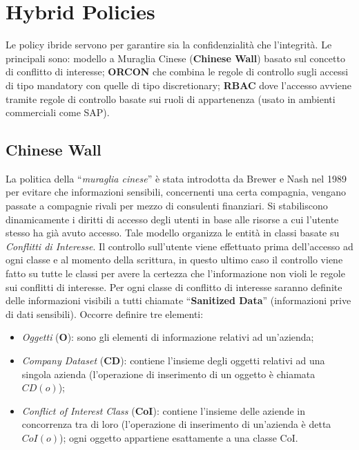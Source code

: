 \section{Hybrid Policies}

Le policy ibride servono per garantire sia la confidenzialità che l'integrità.
Le principali sono: modello a Muraglia Cinese (\textbf{Chinese Wall}) basato sul
concetto di conflitto di interesse; \textbf{ORCON} che combina le regole di
controllo sugli accessi di tipo mandatory con quelle di tipo discretionary;
\textbf{RBAC} dove l'accesso avviene tramite regole di controllo basate sui
ruoli di appartenenza (usato in ambienti commerciali come SAP).

\subsection{Chinese Wall}

La politica della ``\textit{muraglia cinese}'' è stata introdotta da Brewer e Nash
nel 1989 per evitare che informazioni sensibili, concernenti una certa compagnia,
vengano passate a compagnie rivali per mezzo di consulenti finanziari.
Si stabiliscono dinamicamente i diritti di accesso degli utenti in base
alle risorse a cui l'utente stesso ha già avuto accesso.
Tale modello organizza le entità in classi basate su \textit{Conflitti di Interesse}.
Il controllo sull'utente
viene effettuato prima dell'accesso ad ogni classe e al momento della scrittura,
in questo ultimo
caso il controllo viene fatto su tutte le classi per avere la certezza che
l'informazione non violi le
regole sui conflitti di interesse. Per ogni classe di conflitto di interesse
saranno definite delle
informazioni visibili a tutti chiamate ``\textbf{Sanitized Data}''
(informazioni prive di dati sensibili).
Occorre definire tre elementi:

\begin{itemize}
    \item \textit{Oggetti} (\textbf{O}): sono gli elementi di informazione
          relativi ad un'azienda;
    \item \textit{Company Dataset} (\textbf{CD}): contiene l'insieme degli
          oggetti relativi ad una singola azienda
          (l'operazione di inserimento di un oggetto è chiamata \(CD(o)\));
    \item \textit{Conflict of Interest Class} (\textbf{CoI}): contiene
          l'insieme delle aziende in concorrenza tra di
          loro (l'operazione di inserimento di un'azienda è detta \(CoI(o)\));
          ogni oggetto appartiene
          esattamente a una classe CoI.
\end{itemize}

